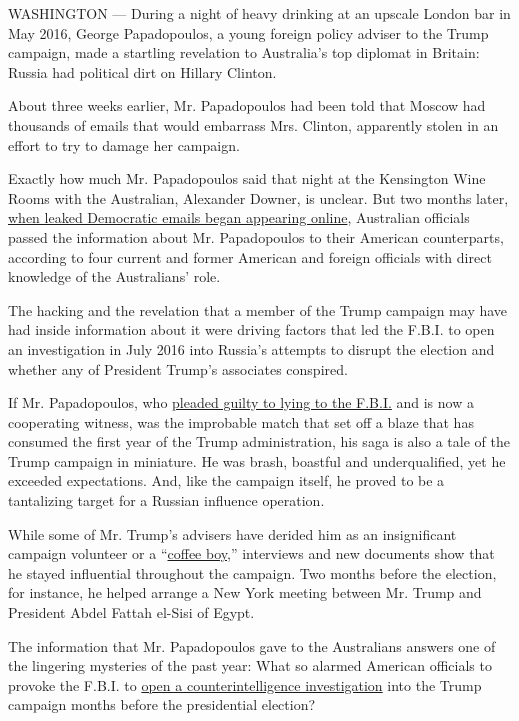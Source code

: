 WASHINGTON --- During a night of heavy drinking at an upscale London bar
in May 2016, George Papadopoulos, a young foreign policy adviser to the
Trump campaign, made a startling revelation to Australia's top diplomat
in Britain: Russia had political dirt on Hillary Clinton.

About three weeks earlier, Mr. Papadopoulos had been told that Moscow
had thousands of emails that would embarrass Mrs. Clinton, apparently
stolen in an effort to try to damage her campaign.

Exactly how much Mr. Papadopoulos said that night at the Kensington Wine
Rooms with the Australian, Alexander Downer, is unclear. But two months
later,
\href{https://www.nytimes.com/2016/07/27/us/politics/assange-timed-wikileaks-release-of-democratic-emails-to-harm-hillary-clinton.html}{when
leaked Democratic emails began appearing online}, Australian officials
passed the information about Mr. Papadopoulos to their American
counterparts, according to four current and former American and foreign
officials with direct knowledge of the Australians' role.

The hacking and the revelation that a member of the Trump campaign may
have had inside information about it were driving factors that led the
F.B.I. to open an investigation in July 2016 into Russia's attempts to
disrupt the election and whether any of President Trump's associates
conspired.

If Mr. Papadopoulos, who
\href{https://www.nytimes.com/2017/10/30/us/politics/george-papadopoulos-russia-trump.html}{pleaded
guilty to lying to the F.B.I.} and is now a cooperating witness, was the
improbable match that set off a blaze that has consumed the first year
of the Trump administration, his saga is also a tale of the Trump
campaign in miniature. He was brash, boastful and underqualified, yet he
exceeded expectations. And, like the campaign itself, he proved to be a
tantalizing target for a Russian influence operation.

While some of Mr. Trump's advisers have derided him as an insignificant
campaign volunteer or a
``\href{http://www.cnn.com/2017/10/31/politics/caputo-papadopoulos-coffee-boy-cnntv/index.html}{coffee
boy},'' interviews and new documents show that he stayed influential
throughout the campaign. Two months before the election, for instance,
he helped arrange a New York meeting between Mr. Trump and President
Abdel Fattah el-Sisi of Egypt.

The information that Mr. Papadopoulos gave to the Australians answers
one of the lingering mysteries of the past year: What so alarmed
American officials to provoke the F.B.I. to
\href{https://www.nytimes.com/2017/03/20/us/politics/fbi-investigation-trump-russia-comey.html}{open
a counterintelligence investigation} into the Trump campaign months
before the presidential election?

